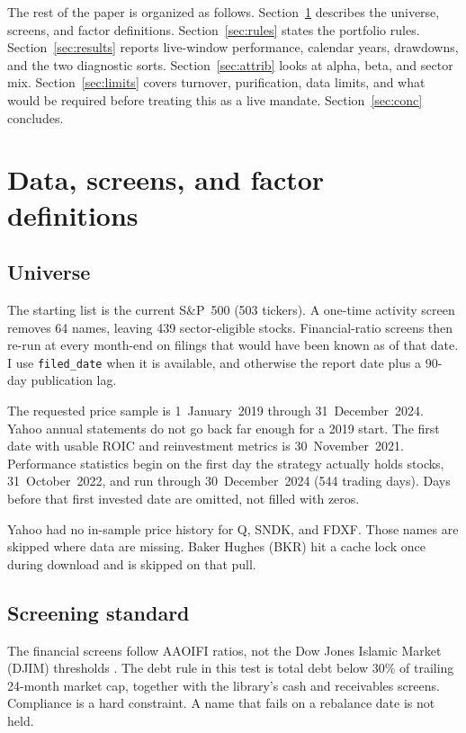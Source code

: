 \documentclass[11pt,letterpaper]{article}
\begin{document}
The rest of the paper is organized as follows. Section~\ref{sec:data} describes the universe, screens, and factor definitions. Section~\ref{sec:rules} states the portfolio rules. Section~\ref{sec:results} reports live-window performance, calendar years, drawdowns, and the two diagnostic sorts. Section~\ref{sec:attrib} looks at alpha, beta, and sector mix. Section~\ref{sec:limits} covers turnover, purification, data limits, and what would be required before treating this as a live mandate. Section~\ref{sec:conc} concludes.

\section{Data, screens, and factor definitions}
\label{sec:data}

\subsection{Universe}

The starting list is the current S\&P~500 (503 tickers). A one-time activity screen removes 64 names, leaving 439 sector-eligible stocks. Financial-ratio screens then re-run at every month-end on filings that would have been known as of that date. I use \texttt{filed\_date} when it is available, and otherwise the report date plus a 90-day publication lag.

The requested price sample is 1~January~2019 through 31~December~2024. Yahoo annual statements do not go back far enough for a 2019 start. The first date with usable ROIC and reinvestment metrics is 30~November~2021. Performance statistics begin on the first day the strategy actually holds stocks, 31~October~2022, and run through 30~December~2024 (544 trading days). Days before that first invested date are omitted, not filled with zeros.

Yahoo had no in-sample price history for Q, SNDK, and FDXF. Those names are skipped where data are missing. Baker Hughes (BKR) hit a cache lock once during download and is skipped on that pull.

\subsection{Screening standard}

The financial screens follow AAOIFI ratios, not the Dow Jones Islamic Market (DJIM) thresholds \citep{aaoifi21,derigs2008}. The debt rule in this test is total debt below 30\% of trailing 24-month market cap, together with the library's cash and receivables screens. Compliance is a hard constraint. A name that fails on a rebalance date is not held.
\end{document}
